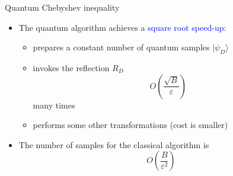 \documentclass{beamer}
\renewcommand{\>}{\rangle}
\newcommand{\<}{\langle}
\begin{document}
%

\begin{frame}{Quantum Chebyshev inequality}
    \begin{itemize}
        \item The quantum algorithm achieves a \textcolor{blue}{square root speed-up}:
    
        \medskip
        \begin{itemize}
            \item prepares a constant number of quantum samples $|\psi_D\>$
        
            \medskip
            \item invokes the reflection $R_D$
            \begin{equation*}
                O\left( \frac{\sqrt{B}}{\varepsilon} \right)
            \end{equation*}
            many times
            
            \medskip
            \item performs some other transformations (cost is smaller)
        \end{itemize}
        
        \bigskip
        \item The number of samples for the classical algorithm is
        \begin{equation*}
            O\left( \frac{B}{\varepsilon^2} \right) 
        \end{equation*}
    \end{itemize}
\end{frame}

%
\end{document}
